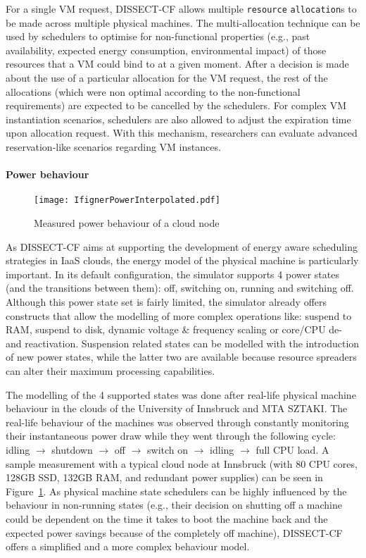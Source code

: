 \documentclass[sort, compress, 5p]{elsarticle}
\begin{document}
For a single VM request, DISSECT-CF allows multiple \verb+resource+ \verb+allocation+s to be made across multiple physical machines. The multi-allocation technique can be used by schedulers to optimise for non-functional properties (e.g., past availability, expected energy consumption, environmental impact) of those resources that a VM could bind to at a given moment. After a decision is made about the use of a particular allocation for the VM request, the rest of the allocations (which were non optimal according to the non-functional requirements) are expected to be cancelled by the schedulers. For complex VM instantiation scenarios, schedulers are also allowed to adjust the expiration time upon allocation request. With this mechanism, researchers can evaluate advanced reservation-like scenarios regarding VM instances.

\paragraph{Power behaviour} 

\begin{figure}[tb]
\centering
\texttt{[image: IfignerPowerInterpolated.pdf]}
\caption{Measured power behaviour of a cloud node\label{FIG-PMbehaviour}}
\end{figure}

As DISSECT-CF aims at supporting the development of energy aware scheduling strategies in IaaS clouds, the energy model of the physical machine is particularly important. In its default configuration, the simulator supports 4 power states (and the transitions between them): off, switching on, running and switching off. Although this power state set is fairly limited, the simulator already offers constructs that allow the modelling of more complex operations like: suspend to RAM, suspend to disk, dynamic voltage \& frequency scaling or core/CPU de- and reactivation. Suspension related states can be modelled with the introduction of new power states, while the latter two are available because resource spreaders can alter their maximum processing capabilities.

The modelling of the 4 supported states was done after real-life physical machine behaviour in the clouds of the University of Innsbruck and MTA SZTAKI. The real-life behaviour of the machines was observed through constantly monitoring their instantaneous power draw while they went through the following cycle: idling $\to$ shutdown $\to$ off $\to$ switch on $\to$ idling $\to$ full CPU load. A sample measurement with a typical cloud node at Innsbruck (with 80 CPU cores, 128GB SSD, 132GB RAM, and redundant power supplies) can be seen in Figure~\ref{FIG-PMbehaviour}. As physical machine state schedulers can be highly influenced by the behaviour in non-running states (e.g., their decision on shutting off a machine could be dependent on the time it takes to boot the machine back and the expected power savings because of the completely off machine), DISSECT-CF offers a simplified and a more complex behaviour model. 
\end{document}
